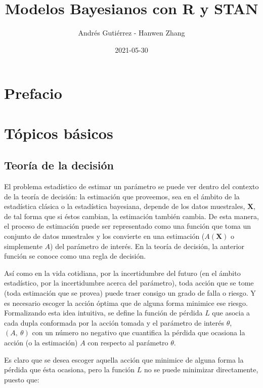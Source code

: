\documentclass[
  spanish,
]{book}
\title{Modelos Bayesianos con R y STAN}
\author{Andrés Gutiérrez - Hanwen Zhang}
\date{2021-05-30}
\theoremstyle{definition}
\theoremstyle{definition}
\theoremstyle{definition}
\theoremstyle{remark}
\begin{document}
\maketitle

{
\hypersetup{linkcolor=}
\setcounter{tocdepth}{1}
\tableofcontents
}
\hypertarget{prefacio}{%
\chapter*{Prefacio}\label{prefacio}}

\hypertarget{tuxf3picos-buxe1sicos}{%
\chapter{Tópicos básicos}\label{tuxf3picos-buxe1sicos}}

\hypertarget{teoruxeda-de-la-decisiuxf3n}{%
\section{Teoría de la decisión}\label{teoruxeda-de-la-decisiuxf3n}}

El problema estadístico de estimar un parámetro se puede ver dentro del contexto de la teoría de decisión: la estimación que proveemos, sea en el ámbito de la estadística clásica o la estadística bayesiana, depende de los datos muestrales, \(\mathbf{X}\), de tal forma que si éstos cambian, la estimación también cambia. De esta manera, el proceso de estimación puede ser representado como una función que toma un conjunto de datos muestrales y los convierte en una estimación (\(A(\mathbf{X})\) o simplemente \(A\)) del parámetro de interés. En la teoría de decisión, la anterior función se conoce como una regla de decisión.

Así como en la vida cotidiana, por la incertidumbre del futuro (en el ámbito estadístico, por la incertidumbre acerca del parámetro), toda acción que se tome (toda estimación que se provea) puede traer consigo un grado de falla o riesgo. Y es necesario escoger la acción óptima que de alguna forma minimice ese riesgo. Formalizando esta idea intuitiva, se define la función de pérdida \(L\) que asocia a cada dupla conformada por la acción tomada y el parámetro de interés \(\theta\), \((A, \ \theta)\) con un número no negativo que cuantifica la pérdida que ocasiona la acción (o la estimación) \(A\) con respecto al parámetro \(\theta\).

Es claro que se desea escoger aquella acción que minimice de alguna forma la pérdida que ésta ocasiona, pero la función \(L\) no se puede minimizar directamente, puesto que:
\end{document}

